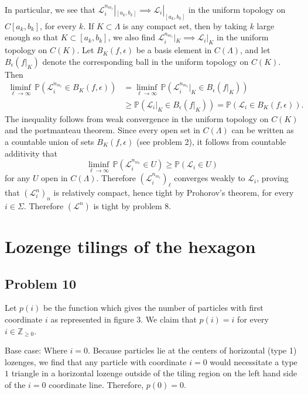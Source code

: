 \documentclass[12pt]{article}
\begin{document}
		In particular, we see that $\mathcal{L}_i^{n_{m_\ell}}|_{[a_k,b_k]} \implies \mathcal{L}_i|_{[a_k,b_k]}$ in the uniform topology on $C[a_k,b_k]$, for every $k$. If $K\subset\Lambda$ is any compact set, then by taking $k$ large enough so that $K\subset [a_k,b_k]$, we also find $\mathcal{L}_i^{n_{m_\ell}}|_K \implies \mathcal{L}_i|_K$ in the uniform topology on $C(K)$. Let $B_K(f,\epsilon)$ be a basis element in $C(\Lambda)$, and let $B_\epsilon(f|_K)$ denote the corresponding ball in the uniform topology on $C(K)$. Then
		\begin{align*}
		\liminf_{\ell\to\infty}\,\mathbb{P}(\mathcal{L}^{n_{m_\ell}}_i \in B_K(f,\epsilon)) &= \liminf_{\ell\to\infty}\,\mathbb{P}(\mathcal{L}^{n_{m_\ell}}_i|_K \in B_\epsilon(f|_K))\\
		& \geq \mathbb{P}(\mathcal{L}_i|_K \in B_\epsilon(f|_K)) = \mathbb{P}(\mathcal{L}_i \in B_K(f,\epsilon)).
		\end{align*}
		The inequality follows from weak convergence in the uniform topology on $C(K)$ and the portmanteau theorem. Since every open set in $C(\Lambda)$ can be written as a countable union of sets $B_K(f,\epsilon)$ (see problem 2), it follows from countable additivity that
		\[
		\liminf_{\ell\to\infty}\,\mathbb{P}(\mathcal{L}^{n_{m_\ell}}_i \in U) \geq \mathbb{P}(\mathcal{L}_i \in U)
		\]
		for any $U$ open in $C(\Lambda)$. Therefore $(\mathcal{L}_i^{n_{m_\ell}})_\ell$ converges weakly to $\mathcal{L}_i$, proving that $(\mathcal{L}^n_i)_n$ is relatively compact, hence tight by Prohorov's theorem, for every $i\in\Sigma$. Therefore $(\mathcal{L}^n)$ is tight by problem 8.


\section{Lozenge tilings of the hexagon}
                                                                                                                                                                                                                  
	\subsection*{Problem 10}
	Let $p(i)$ be the function which gives the number of particles with first coordinate $i$ as represented in figure 3. We claim that $p(i)=i$ for every $i\in\mathbb{Z}_{\geq 0}$.
	
	Base case: Where $i=0$. Because particles lie at the centers of horizontal (type 1) lozenges, we find that any particle with coordinate $i=0$ would necessitate a type $1$ triangle in a horizontal lozenge outside of the tiling region on the left hand side of the $i=0$ coordinate line. Therefore, $p(0)=0$.
	
\end{document}
